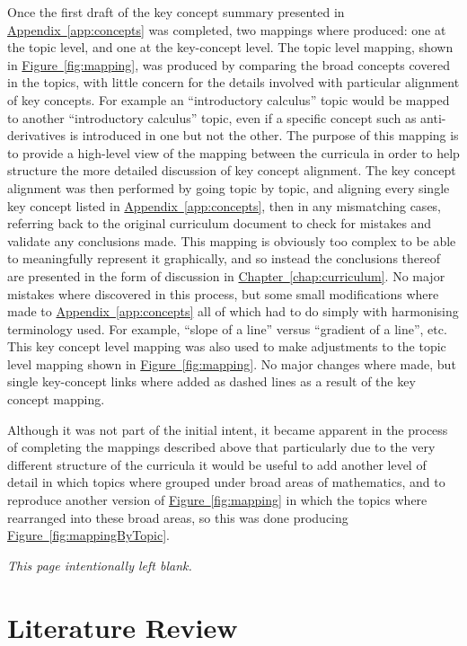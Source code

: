 \documentclass[twoside,12pt,a4paper]{report}
\makeatletter
\newcommand*{\intentionallyblankpage}{
  \vspace*{\fill}
  {\centering \textit{This page intentionally left blank.} \par}
  \vspace{\fill}}
\renewcommand*{\cleardoublepage}{\clearpage\if@twoside \ifodd\c@page\else
  \intentionallyblankpage
  \newpage
  \if@twocolumn\hbox{}\newpage\fi\fi\fi}
\newcommand{\refchap}[1]{\hyperref[chap:#1]{Chapter~\ref{chap:#1}}}
\newcommand{\reffig}[1]{\hyperref[fig:#1]{Figure~\ref{fig:#1}}}
\newcommand{\refapp}[1]{\hyperref[app:#1]{Appendix~\ref{app:#1}}}
\makeatother
\begin{document}
Once the first draft of the key concept summary presented in \refapp{concepts} was completed, two mappings where produced: one at the topic level, and one at the key-concept level. The topic level mapping, shown in \reffig{mapping}, was produced by comparing the broad concepts covered in the topics, with little concern for the details involved with particular alignment of key concepts. For example an ``introductory calculus'' topic would be mapped to another ``introductory calculus'' topic, even if a specific concept such as anti-derivatives is introduced in one but not the other. The purpose of this mapping is to provide a high-level view of the mapping between the curricula in order to help structure the more detailed discussion of key concept alignment. The key concept alignment was then performed by going topic by topic, and aligning every single key concept listed in \refapp{concepts}, then in any mismatching cases, referring back to the original curriculum document to check for mistakes and validate any conclusions made. This mapping is obviously too complex to be able to meaningfully represent it graphically, and so instead the conclusions thereof are presented in the form of discussion in \refchap{curriculum}. No major mistakes where discovered in this process, but some small modifications where made to \refapp{concepts} all of which had to do simply with harmonising terminology used. For example, ``slope of a line'' versus ``gradient of a line'', etc. This key concept level mapping was also used to make adjustments to the topic level mapping shown in \reffig{mapping}. No major changes where made, but single key-concept links where added as dashed lines as a result of the key concept mapping. 

Although it was not part of the initial intent, it became apparent in the process of completing the mappings described above that particularly due to the very different structure of the curricula it would be useful to add another level of detail in which topics where grouped under broad areas of mathematics, and to reproduce another version of \reffig{mapping} in which the topics where rearranged into these broad areas, so this was done producing \reffig{mappingByTopic}.




\cleardoublepage
\chapter{Literature Review}
\label{chap:literature}
\end{document}
